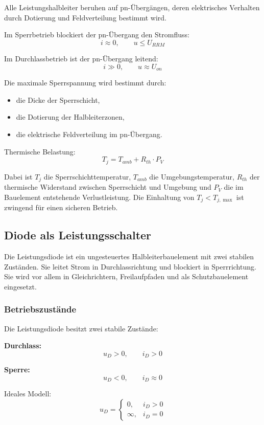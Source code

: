 Alle Leistungshalbleiter beruhen auf pn-Übergängen, deren elektrisches Verhalten
durch Dotierung und Feldverteilung bestimmt wird.

Im Sperrbetrieb blockiert der pn-Übergang den Stromfluss:
\[
i \approx 0,\qquad u \le U_{RRM}
\]

Im Durchlassbetrieb ist der pn-Übergang leitend:
\[
i \gg 0,\qquad u \approx U_{on}
\]

Die maximale Sperrspannung wird bestimmt durch:
\begin{itemize}
\item die Dicke der Sperrschicht,
\item die Dotierung der Halbleiterzonen,
\item die elektrische Feldverteilung im pn-Übergang.
\end{itemize}

Thermische Belastung:
\[
\boxed{T_j = T_{amb} + R_{th} \cdot P_V}
\]

Dabei ist $T_j$ die Sperrschichttemperatur, $T_{amb}$ die Umgebungstemperatur,
$R_{th}$ der thermische Widerstand zwischen Sperrschicht und Umgebung
und $P_V$ die im Bauelement entstehende Verlustleistung.
Die Einhaltung von $T_j < T_{j,\max}$ ist zwingend für einen sicheren Betrieb.

\subsection{Diode als Leistungsschalter}

Die Leistungsdiode ist ein ungesteuertes Halbleiterbauelement mit zwei stabilen Zuständen.
Sie leitet Strom in Durchlassrichtung und blockiert in Sperrrichtung.
Sie wird vor allem in Gleichrichtern, Freilaufpfaden und als Schutzbauelement eingesetzt.

\subsubsection{Betriebszustände}

Die Leistungsdiode besitzt zwei stabile Zustände:

\textbf{Durchlass:}
\[
u_D > 0,\qquad i_D > 0
\]

\textbf{Sperre:}
\[
u_D < 0,\qquad i_D \approx 0
\]

Ideales Modell:
\[
u_D =
\begin{cases}
0, & i_D > 0 \\
\infty, & i_D = 0
\end{cases}
\]

